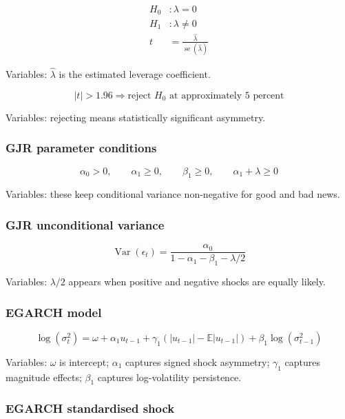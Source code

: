 \documentclass[
  8pt,
  twocolumn]{extarticle}
\begin{document}
\[
\begin{aligned}
H_0&:\lambda=0\\
H_1&:\lambda\ne0\\
t&=\frac{\hat\lambda}{\operatorname{se}(\hat\lambda)}
\end{aligned}
\]

Variables: \(\hat\lambda\) is the estimated leverage coefficient.

\[
|t|>1.96\Rightarrow \text{reject }H_0\text{ at approximately 5 percent}
\]

Variables: rejecting means statistically significant asymmetry.

\subsubsection{GJR parameter conditions}\label{gjr-parameter-conditions}

\[
\alpha_0>0,\qquad \alpha_1\ge0,\qquad \beta_1\ge0,\qquad \alpha_1+\lambda\ge0
\]

Variables: these keep conditional variance non-negative for good and bad
news.

\subsubsection{GJR unconditional
variance}\label{gjr-unconditional-variance}

\[
\operatorname{Var}(\epsilon_t)=\frac{\alpha_0}{1-\alpha_1-\beta_1-\lambda/2}
\]

Variables: \(\lambda/2\) appears when positive and negative shocks are
equally likely.

\subsubsection{EGARCH model}\label{egarch-model}

\[
\log(\sigma_t^2)=\omega+\alpha_1u_{t-1}+\gamma_1(|u_{t-1}|-\mathbb E|u_{t-1}|)+\beta_1\log(\sigma_{t-1}^2)
\]

Variables: \(\omega\) is intercept; \(\alpha_1\) captures signed shock
asymmetry; \(\gamma_1\) captures magnitude effects; \(\beta_1\) captures
log-volatility persistence.

\subsubsection{EGARCH standardised
shock}\label{egarch-standardised-shock}
\end{document}
